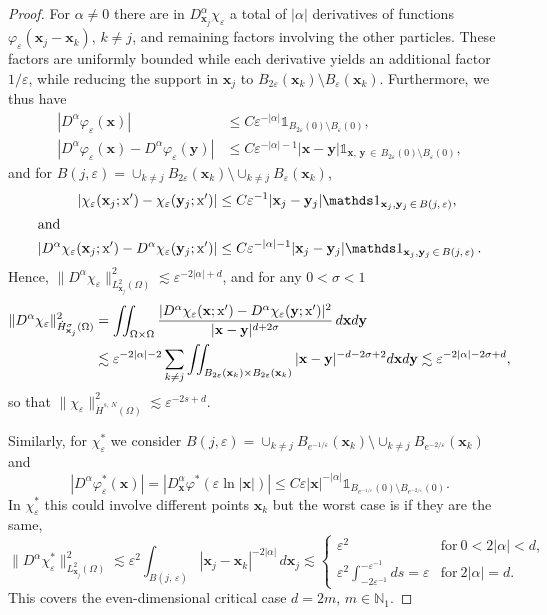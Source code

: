 \documentclass[10pt]{amsart}
\theoremstyle{definition}\newtheorem{defi}[theo]{Definition}\newtheorem{rema}[theo]{Remark}\newtheorem{exam}[theo]{Example}\newtheorem{exem}[theo]{Example}\newtheorem{nota}[theo]{Notation}
\newcommand*\eps{\varepsilon}
\newcommand*\N {\mathbb{N}}
\newcommand\1{{\ensuremath {\mathds 1} }}
\newcommand{\bx}{\mathbf{x}}
\newcommand{\by}{\mathbf{y}}
\newcommand{\sx}{\textup{x}}
\begin{document}
\begin{proof}
For $\alpha \neq 0$ there are in $D^\alpha_{\bx_j} \chi_\eps$ a total of $|\alpha|$ derivatives of functions $\varphi_\eps(\bx_j-\bx_k)$, $k \neq j$, and remaining factors involving the other particles. These factors are uniformly bounded while each derivative yields an additional factor $1/\eps$, while reducing the support in $\bx_j$ to $B_{2\eps}(\bx_k) \setminus B_{\eps}(\bx_k)$. Furthermore, we thus have
\begin{align*}
|D^\alpha \varphi_\eps(\bx)|&\le C \eps^{-|\alpha|} \1_{B_{2\eps}(0) \setminus B_{\eps}(0)},
\\
|D^\alpha \varphi_\eps(\bx) - D^\alpha \varphi_\eps(\by)|&\le C \eps^{-|\alpha|-1} |\bx-\by| \1_{\bx,\,\by\,\in\,B_{2\eps}(0) \setminus B_{\eps}(0)},
\end{align*}
and for $B(j,\eps) = \cup_{k \neq j} B_{2\eps}(\bx_k) \setminus \cup_{k \neq j} B_{\eps}(\bx_k)$,
\begin{align*}
|\chi_\eps(\bx_j;\sx') - \chi_\eps(\by_j;\sx')|
&\le C \eps^{-1}|\bx_j-\by_j|
\1_{\bx_j,\by_j\,\in\,B(j,\,\eps)},
\\
\intertext{and}
|D^\alpha \chi_\eps(\bx_j;\sx') - D^\alpha \chi_\eps(\by_j;\sx')|
&\le C \eps^{-|\alpha|-1}|\bx_j-\by_j|
\1_{\bx_j,\by_j\,\in\,B(j,\,\eps)}\,.
\end{align*}
Hence, $\|D^\alpha \chi_\eps\|_{L^2_{\bx_j}(\Omega)}^2 \lesssim \eps^{-2|\alpha|+d}$, and for any $0<\sigma<1$
\begin{align*}
\|D^\alpha \chi_\eps\|_{\dot{H}^\sigma_{\bx_j}(\Omega)}^2 &= \iint_{\Omega \times \Omega} \dfrac{|D^\alpha\chi_\eps(\bx;\sx') - D^\alpha\chi_\eps(\by;\sx')|^2}{|\bx-\by|^{d+2\sigma}}\,d\bx d\by \\
&\lesssim \eps^{-2|\alpha|-2} \sum_{k \neq j} \iint_{B_{2\eps}(\bx_k) \times B_{2\eps}(\bx_k)} |\bx - \by|^{-d-2\sigma+2} d\bx d\by
\lesssim \eps^{-2|\alpha|-2\sigma+d},
\end{align*}
so that $\|\chi_\eps\|_{\dot{H}^{s,\,N}(\Omega)}^2 \lesssim \eps^{-2s+d}$.

Similarly, for $\chi_\eps^*$ we consider $B(j,\eps) = \cup_{k \neq j} B_{e^{-1/\eps}}(\bx_k) \setminus \cup_{k \neq j} B_{e^{-2/\eps}}(\bx_k)$ and
\begin{equation}\label{eq:phi_star_bound}
|D^\alpha\varphi_\eps^*(\bx)| = \left|D^\alpha_\bx \varphi^*(\eps\ln|\bx|)\right|
\le C \eps |\bx|^{-|\alpha|} \1_{B_{e^{-1/\eps}}(0) \setminus B_{e^{-2/\eps}}(0)}.
\end{equation}
In $\chi_\eps^*$ this could involve different points $\bx_k$ but the worst case is if they are the same,
\[
\|D^\alpha \chi_\eps^*\|_{L^2_{\bx_j}(\Omega)}^2
\lesssim \eps^{2} \int_{B(j,\,\eps)} |\bx_j - \bx_k|^{-2|\alpha|} \,d\bx_j
\lesssim
\begin{cases} \eps^{2} & \text{for}\ 0<2|\alpha|<d, \\
\eps^{2} \int_{-2\eps^{-1}}^{-\eps^{-1}} ds = \eps & \text{for}\ 2|\alpha|=d.
\end{cases}
\]
This covers the even-dimensional critical case $d=2m$, $m \in \N_1$.


\end{proof}
\end{document}
